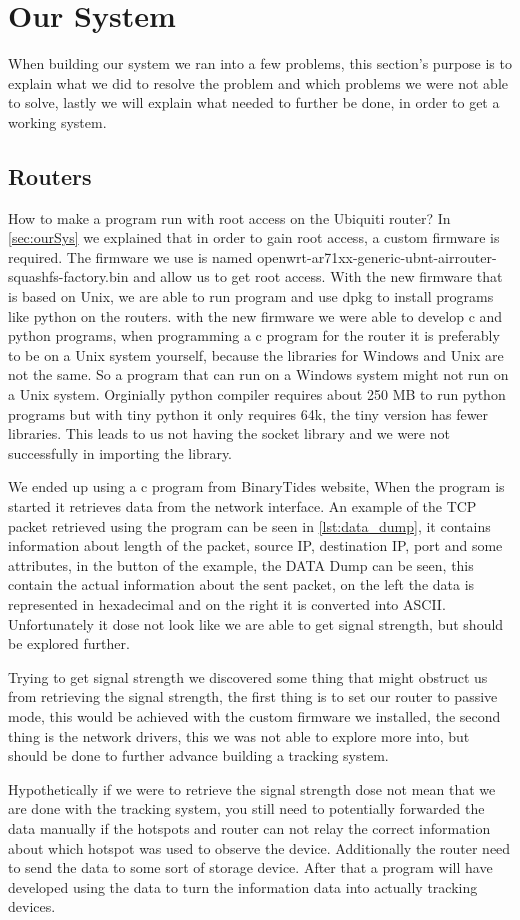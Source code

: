 \section{Our System}
When building our system we ran into a few problems, this section's purpose is to explain what we did to resolve the problem and which problems we were not able to solve, lastly we will explain what needed to further be done, in order to get a working system.

\subsection*{Routers}
How to make a program run with root access on the Ubiquiti router? In \cref{sec:ourSys} we explained that in order to gain root access, a custom firmware is required. The firmware we use is named openwrt-ar71xx-generic-ubnt-airrouter-squashfs-factory.bin and allow us to get root access. With the new firmware that is based on Unix, we are able to run program and use dpkg to install programs like python on the routers. with the new firmware we were able to develop c and python programs, when programming a c program for the router it is preferably to be on a Unix system yourself, because the libraries for Windows and Unix are not the same. So a program that can run on a Windows system might not run on a Unix system. Orginially python compiler requires about 250 MB to run python programs but with tiny python it only requires 64k, the tiny version has fewer libraries. This leads to us not having the socket library and we were not successfully in importing the library.

We ended up using a c program from BinaryTides website\cite{SnifferCode}, When the program is started it retrieves data from the network interface. An example of the TCP packet retrieved using the program can be seen in \cref{lst:data_dump}, it contains information about length of the packet, source IP, destination IP, port and some attributes, in the button of the example, the DATA Dump can be seen, this contain the actual information about the sent packet, on the left the data is represented in hexadecimal and on the right it is converted into ASCII. Unfortunately it dose not look like we are able to get signal strength, but should be explored further.

Trying to get signal strength we discovered some thing that might obstruct us from retrieving the signal strength, the first thing is to set our router to passive mode, this would be achieved with the custom firmware we installed, the second thing is the network drivers, this we was not able to explore more into, but should be done to further advance building a tracking system.

Hypothetically if we were to retrieve the signal strength dose not mean that we are done with the tracking system, you still need to potentially forwarded the data manually if the hotspots and router can not relay the correct information about which hotspot was used to observe the device. Additionally the router need to send the data to some sort of storage device. After that a program will have developed using the data to turn the information data into actually tracking devices.
